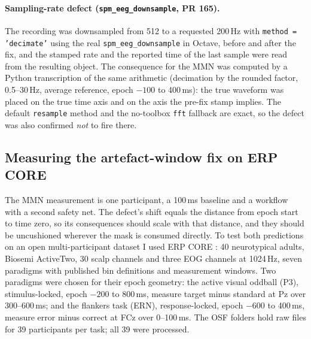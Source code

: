 \documentclass[11pt]{article}
\newcommand{\code}[1]{\texttt{#1}}
\begin{document}
\paragraph{Sampling-rate defect (\code{spm\_eeg\_downsample}, PR 165).} The recording was downsampled from 512 to a requested 200\,Hz with \code{method = 'decimate'} using the real \code{spm\_eeg\_downsample} in Octave, before and after the fix, and the stamped rate and the reported time of the last sample were read from the resulting object. The consequence for the MMN was computed by a Python transcription of the same arithmetic (decimation by the rounded factor, 0.5--30\,Hz, average reference, epoch $-100$ to 400\,ms): the true waveform was placed on the true time axis and on the axis the pre-fix stamp implies. The default \code{resample} method and the no-toolbox \code{fft} fallback are exact, so the defect was also confirmed \emph{not} to fire there.

\subsection{Measuring the artefact-window fix on ERP CORE}
\label{sec:erpmethods}
The MMN measurement is one participant, a 100\,ms baseline and a workflow with a second safety net. The defect's shift equals the distance from epoch start to time zero, so its consequences should scale with that distance, and they should be uncushioned wherever the mask is consumed directly. To test both predictions on an open multi-participant dataset I used ERP CORE \cite{kappenman2021}: 40 neurotypical adults, Biosemi ActiveTwo, 30 scalp channels and three EOG channels at 1024\,Hz, seven paradigms with published bin definitions and measurement windows. Two paradigms were chosen for their epoch geometry: the active visual oddball (P3), stimulus-locked, epoch $-200$ to 800\,ms, measure target minus standard at Pz over 300--600\,ms; and the flankers task (ERN), response-locked, epoch $-600$ to 400\,ms, measure error minus correct at FCz over 0--100\,ms. The OSF folders hold raw files for 39 participants per task; all 39 were processed.
\end{document}
